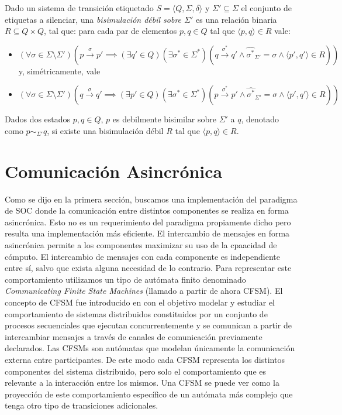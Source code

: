 \begin{definition} Dado un sistema de transición etiquetado $ S = \langle Q, \Sigma, \delta \rangle $ y $\Sigma' \subseteq \Sigma$ el conjunto de etiquetas a silenciar, una \emph{bisimulación débil sobre $\Sigma'$} es una relación binaria $R \subseteq Q \times Q$, tal que: para cada par de elementos $p, q \in Q$ tal que $\langle p, q \rangle \in R$ vale:
\begin{itemize}
    \item $(\forall \sigma \in \Sigma \setminus \Sigma')(p \xrightarrow{\sigma} p' \implies (\exists q' \in Q)(\exists \sigma^* \in \Sigma^*)(q \xrightarrow{\sigma^*} q' \land \widehat{\sigma^*}_{\Sigma'} = \sigma \land \langle p', q' \rangle \in R))$ y, simétricamente, vale 
    \item $(\forall \sigma \in \Sigma \setminus \Sigma')(q \xrightarrow{\sigma} q' \implies (\exists p' \in Q)(\exists \sigma^* \in \Sigma^*)(p \xrightarrow{\sigma^*} p' \land \widehat{\sigma^*}_{\Sigma'} = \sigma \land \langle p', q' \rangle \in R))$
\end{itemize}
Dados dos estados $p, q \in Q $, $p$ es debilmente bisimilar sobre $\Sigma'$ a $q$, denotado como $p \sim_{\Sigma'} q$, si existe una bisimulación débil $R$ tal que $\langle p, q \rangle \in R$.
\end{definition}


\section{Comunicación Asincrónica}
Como se dijo en la primera sección, buscamos una implementación del paradigma de SOC donde la comunicación entre distintos componentes se realiza en forma asincrónica. Esto no es un requerimiento del paradigma propiamente dicho pero resulta una implementación más eficiente. El intercambio de mensajes en forma asincrónica permite a los componentes maximizar su uso de la cpaacidad de cómputo.  El intercambio de mensajes con cada componente es independiente entre sí, salvo que exista alguna necesidad de lo contrario. Para representar este comportamiento utilizamos un tipo de autómata finito denominado \emph{Communicating Finite State Machines} (llamado a partir de ahora CFSM). El concepto de CFSM fue introducido en \cite{brand:jacm-30_2} con el objetivo modelar y estudiar el comportamiento de sistemas distribuidos constituidos por un conjunto de procesos secuenciales que ejecutan concurrentemente y se comunican a partir de intercambiar mensajes a través de canales de comunicación previamente declarados. Las CFSMs son autómatas que modelan únicamente la comunicación externa entre participantes. De este modo cada CFSM representa los distintos componentes del sistema distribuido, pero solo el comportamiento que es relevante a la interacción entre los mismos. Una CFSM se puede ver como la proyección de este comportamiento específico de un autómata más complejo que tenga otro tipo de transiciones adicionales.

